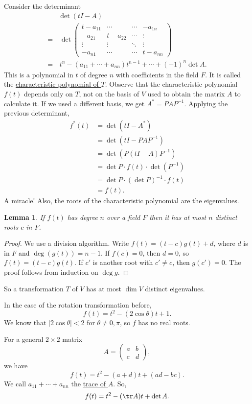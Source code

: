 \documentclass[11pt, oneside]{amsart}
\numberwithin{equation}{section}
\numberwithin{theorem}{section}
\newtheorem{lemma}[theorem]{Lemma}
\theoremstyle{definition}
\begin{document}
Consider the determinant 
\begin{align*}
&\det(tI - A)\\
=&\,\det \begin{pmatrix} t-a_{11} &\cdots&\cdots& -a_{1n}\\ -a_{21}&t-a_{22} &\cdots&\vdots \\ \vdots&\vdots&\ddots &\vdots \\ -a_{n1}&\cdots&\cdots&t-a_{nn} \end{pmatrix}\\
=&\, t^n - (a_{11} + \cdots + a_{nn})t^{n-1} +\cdots + (-1)^n\det A.
\end{align*}
This is a polynomial in $t$ of degree $n$ with coefficients in the field $F$. It is called the \underline{characteristic polynomial of $T$}. Observe that the characteristic polynomial $f(t)$ depends only on $T$, not on the basis of $V$ used to obtain the matrix $A$ to calculate it. If we used a different basis, we get $A^* = PAP^{-1}$. Applying the previous determinant,
\begin{align*}
f^*(t) &= \det (tI-A^*)\\
&= \det (tI - PAP^{-1})\\
&= \det(P(tI-A)P^{-1})\\
&= \det P \cdot f(t) \cdot \det(P^{-1})\\
&= \det P \cdot (\det P)^{-1} \cdot f(t)\\
&= f(t).
\end{align*}
A miracle! Also, the roots of the characteristic polynomial are the eigenvalues.
\begin{lemma}
If $f(t)$ has degree $n$ over a field $F$ then it has at most $n$ distinct roots $c$ in $F$.
\end{lemma}
\begin{proof}
We use a division algorithm. Write $f(t) = (t-c)g(t)+d$, where $d$ is in $F$ and $\deg(g(t)) = n-1$. If $f(c)=0$, then $d=0$, so $f(t)=(t-c)g(t)$. If $c'$ is another root with $c'\neq c$, then $g(c') = 0$. The proof follows from induction on $\deg g$.
\end{proof}
So a transformation $T$ of $V$ has at most $\dim V$ distinct eigenvalues.

In the case of the rotation transformation before, 
$$
f(t) = t^2 - (2\cos\theta)t + 1.
$$
We know that $|2\cos\theta|<2$ for $\theta \neq 0,\pi$, so $f$ has no real roots. 

For a general $2\times 2$ matrix
$$
A = \begin{pmatrix} a & b\\ c &d \end{pmatrix},
$$
we have
$$
f(t) = t^2 - (a+d)t + (ad - bc).
$$
We call $a_{11} + \cdots + a_{nn}$ the \underline{trace of $A$}. So,
$$
f(t) = t^2 - (\tr A)t + \det A.
$$
\end{document}
